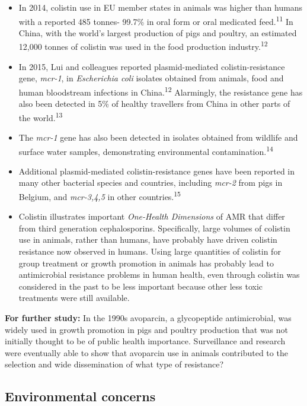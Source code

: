 \documentclass[
]{book}
\begin{document}
\begin{itemize}
\item
  In 2014, colistin use in EU member states in animals was higher than humans with a reported 485 tonnes- 99.7\% in oral form or oral medicated feed.\textsuperscript{11} In China, with the world's largest production of pigs and poultry, an estimated 12,000 tonnes of colistin was used in the food production industry.\textsuperscript{12}
\item
  In 2015, Lui and colleagues reported plasmid-mediated colistin-resistance gene, \emph{mcr-1}, in \emph{Escherichia coli} isolates obtained from animals, food and human bloodstream infections in China.\textsuperscript{12} Alarmingly, the resistance gene has also been detected in 5\% of healthy travellers from China in other parts of the world.\textsuperscript{13}
\item
  The \emph{mcr-1} gene has also been detected in isolates obtained from wildlife and surface water samples, demonstrating environmental contamination.\textsuperscript{14}
\item
  Additional plasmid-mediated colistin-resistance genes have been reported in many other bacterial species and countries, including \emph{mcr-2} from pigs in Belgium, and \emph{mcr-3,4,5} in other countries.\textsuperscript{15}
\item
  Colistin illustrates important \emph{One-Health Dimensions} of AMR that differ from third generation cephalosporins. Specifically, large volumes of colistin use in animals, rather than humans, have probably have driven colistin resistance now observed in humans. Using large quantities of colistin for group treatment or growth promotion in animals has probably lead to antimicrobial resistance problems in human health, even through colistin was considered in the past to be less important because other less toxic treatments were still available.
\end{itemize}

\textbf{For further study:} In the 1990s avoparcin, a glycopeptide antimicrobial, was widely used in growth promotion in pigs and poultry production that was not initially thought to be of public health importance. Surveillance and research were eventually able to show that avoparcin use in animals contributed to the selection and wide dissemination of what type of resistance?

\hypertarget{environmental-concerns}{%
\subsection*{Environmental concerns}\label{environmental-concerns}}
\end{document}
